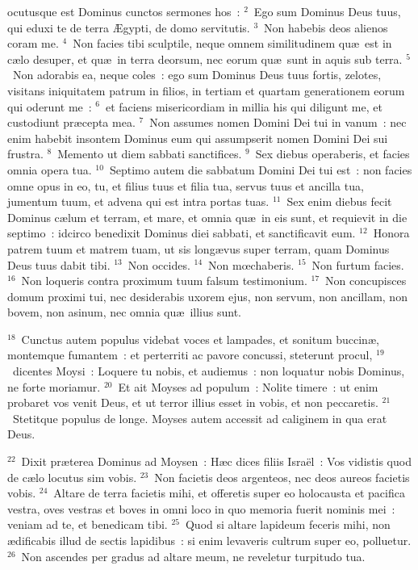 \bchapter
{}ocutusque est Dominus cunctos sermones hos~:
${}^{2}$~Ego sum Dominus Deus tuus, qui eduxi te de terra \AE gypti, de domo servitutis.
${}^{3}$~Non habebis deos alienos coram me.
${}^{4}$~Non facies tibi sculptile, neque omnem similitudinem qu\ae\ est in c\ae lo desuper, et qu\ae\ in terra deorsum, nec eorum qu\ae\ sunt in aquis sub terra.
${}^{5}$~Non adorabis ea, neque coles~: ego sum Dominus Deus tuus fortis, zelotes, visitans iniquitatem patrum in filios, in tertiam et quartam generationem eorum qui oderunt me~:
${}^{6}$~et faciens misericordiam in millia his qui diligunt me, et custodiunt pr\ae cepta mea.
${}^{7}$~Non assumes nomen Domini Dei tui in vanum~: nec enim habebit insontem Dominus eum qui assumpserit nomen Domini Dei sui frustra.
${}^{8}$~Memento ut diem sabbati sanctifices.
${}^{9}$~Sex diebus operaberis, et facies omnia opera tua.
${}^{10}$~Septimo autem die sabbatum Domini Dei tui est~: non facies omne opus in eo, tu, et filius tuus et filia tua, servus tuus et ancilla tua, jumentum tuum, et advena qui est intra portas tuas.
${}^{11}$~Sex enim diebus fecit Dominus c\ae lum et terram, et mare, et omnia qu\ae\ in eis sunt, et requievit in die septimo~: idcirco benedixit Dominus diei sabbati, et sanctificavit eum.
${}^{12}$~Honora patrem tuum et matrem tuam, ut sis long\ae vus super terram, quam Dominus Deus tuus dabit tibi.
${}^{13}$~Non occides.
${}^{14}$~Non mœchaberis.
${}^{15}$~Non furtum facies.
${}^{16}$~Non loqueris contra proximum tuum falsum testimonium.
${}^{17}$~Non concupisces domum proximi tui, nec desiderabis uxorem ejus, non servum, non ancillam, non bovem, non asinum, nec omnia qu\ae\ illius sunt.


${}^{18}$~Cunctus autem populus videbat voces et lampades, et sonitum buccin\ae , montemque fumantem~: et perterriti ac pavore concussi, steterunt procul,
${}^{19}$~dicentes Moysi~: Loquere tu nobis, et audiemus~: non loquatur nobis Dominus, ne forte moriamur.
${}^{20}$~Et ait Moyses ad populum~: Nolite timere~: ut enim probaret vos venit Deus, et ut terror illius esset in vobis, et non peccaretis.
${}^{21}$~Stetitque populus de longe. Moyses autem accessit ad caliginem in qua erat Deus.


${}^{22}$~Dixit pr\ae terea Dominus ad Moysen~: H\ae c dices filiis Isra\"el~: Vos vidistis quod de c\ae lo locutus sim vobis.
${}^{23}$~Non facietis deos argenteos, nec deos aureos facietis vobis.
${}^{24}$~Altare de terra facietis mihi, et offeretis super eo holocausta et pacifica vestra, oves vestras et boves in omni loco in quo memoria fuerit nominis mei~: veniam ad te, et benedicam tibi.
${}^{25}$~Quod si altare lapideum feceris mihi, non \ae dificabis illud de sectis lapidibus~: si enim levaveris cultrum super eo, polluetur.
${}^{26}$~Non ascendes per gradus ad altare meum, ne reveletur turpitudo tua.

